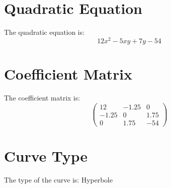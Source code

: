 \documentclass{article}
\begin{document}
\section*{Quadratic Equation}
The quadratic equation is: 
\[ 12x^2-5xy+7y-54 \]
\section*{Coefficient Matrix}
The coefficient matrix is: 
\[
\begin{pmatrix}
12 & -1.25 & 0 \\
-1.25 & 0 & 1.75 \\
0 & 1.75 & -54
\end{pmatrix}
\]
\section*{Curve Type}
The type of the curve is: Hyperbole
\end{document}
